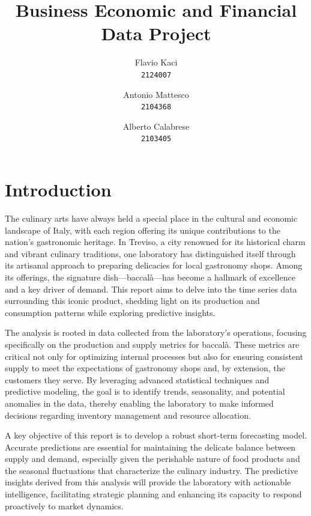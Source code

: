 \documentclass[10pt,twocolumn,letterpaper]{article}
\begin{document}
\title{Business Economic and Financial Data Project}

\author{
Flavio Kaci\\
{\tt\small 2124007}
\and
Antonio Mattesco\\
{\tt\small 2104368}
\and 
Alberto Calabrese\\
{\tt\small 2103405}
}

\date{}
\maketitle


\section{Introduction}
The culinary arts have always held a special place in the cultural and economic landscape of Italy, with each region offering its unique contributions to the nation’s gastronomic heritage. In Treviso, a city renowned for its historical charm and vibrant culinary traditions, one laboratory has distinguished itself through its artisanal approach to preparing delicacies for local gastronomy shops. Among its offerings, the signature dish—baccalà—has become a hallmark of excellence and a key driver of demand. This report aims to delve into the time series data surrounding this iconic product, shedding light on its production and consumption patterns while exploring predictive insights.

The analysis is rooted in data collected from the laboratory’s operations, focusing specifically on the production and supply metrics for baccalà. These metrics are critical not only for optimizing internal processes but also for ensuring consistent supply to meet the expectations of gastronomy shops and, by extension, the customers they serve. By leveraging advanced statistical techniques and predictive modeling, the goal is to identify trends, seasonality, and potential anomalies in the data, thereby enabling the laboratory to make informed decisions regarding inventory management and resource allocation.

A key objective of this report is to develop a robust short-term forecasting model. Accurate predictions are essential for maintaining the delicate balance between supply and demand, especially given the perishable nature of food products and the seasonal fluctuations that characterize the culinary industry. The predictive insights derived from this analysis will provide the laboratory with actionable intelligence, facilitating strategic planning and enhancing its capacity to respond proactively to market dynamics.
\end{document}
